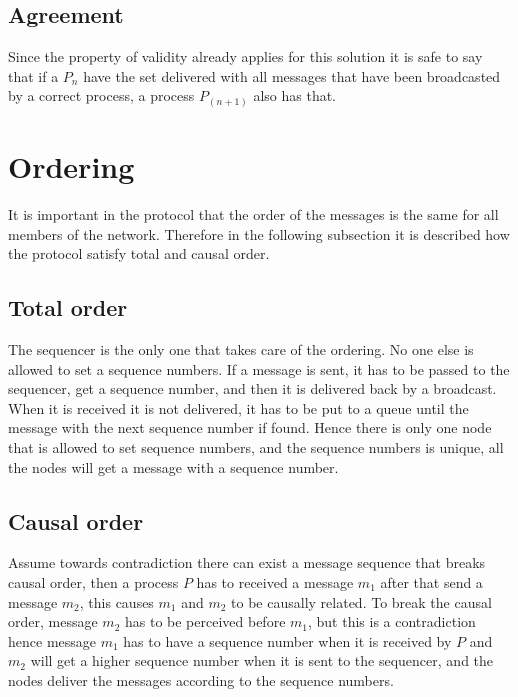 \documentclass{article}
\begin{document}

\subsection{Agreement}
Since the property of validity already applies for this solution it is safe to say that if a $P_n$ have the set delivered with all
messages that have been broadcasted by a correct process, a process $P_(n+1)$ also has that.

\section{Ordering}
  It is important in the protocol that the order of the messages is the same 
  for all members of the network. Therefore in the following subsection it is 
  described how the protocol satisfy total and causal order.

\subsection{Total order}
  The sequencer is the only one that takes care of the ordering. 
  No one else is allowed to set a sequence numbers. If a message 
  is sent, it has to be passed to the sequencer, get a sequence 
  number, and then it is delivered back by a broadcast. When it 
  is received it is not delivered, it has to be put to a queue 
  until the message with the next sequence number if found. 
  Hence there is only one node that is allowed to set sequence 
  numbers, and the  sequence numbers is unique, all the nodes 
  will get a message with a sequence number.
  
\subsection{Causal order}
  Assume towards contradiction there can exist a message sequence
  that breaks causal order, then a process $P$ has to received a message $m_1$
  after that send a message $m_2$, this causes $m_1$ and $m_2$ to be causally
  related. To break the causal order, message $m_2$ has to be perceived before $m_1$, 
  but this is a contradiction hence message $m_1$ has to have a sequence number when 
  it is received by $P$ and $m_2$ will get a higher sequence number when it is sent 
  to the sequencer, and the nodes deliver the messages according to the sequence numbers.
\end{document}
